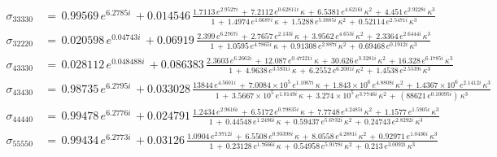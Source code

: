 \begin{align}
  \label{eq:ys33330}
  \sigma_{33330} \, &= \, 0.99569\,e^{6.2785i} \, + 0.014546 \, \frac{ 1.7113\,e^{2.9527i}  \, + \,  7.2112\,e^{0.62811i}\,\kappa \, + \, 6.5381\,e^{4.6216i}\,{\kappa}^{2} \, + \, 4.451\,e^{2.9228i}\,{\kappa}^{3} }{ 1 \, + \,   1.4974\,e^{1.6687i}\,\kappa \, + \, 1.5288\,e^{5.3885i}\,{\kappa}^{2} \, + \, 0.52114\,e^{2.5471i}\,{\kappa}^{3} }   \\
  \label{eq:ys32220}
  \sigma_{32220} \, &= \, 0.020598\,e^{0.04743i} \, + 0.06919 \, \frac{ 2.399\,e^{6.2767i}  \, + \,  2.7657\,e^{2.133i}\,\kappa \, + \, 3.9562\,e^{4.653i}\,{\kappa}^{2} \, + \, 2.3364\,e^{2.6444i}\,{\kappa}^{3} }{ 1 \, + \,   1.0595\,e^{4.7865i}\,\kappa \, + \, 0.91308\,e^{2.887i}\,{\kappa}^{2} \, + \, 0.69468\,e^{0.1912i}\,{\kappa}^{3} }   \\
  \label{eq:ys43330}
  \sigma_{43330} \, &= \, 0.028112\,e^{0.048488i} \, + 0.086383 \, \frac{  2.3603\,e^{6.2662i}  \, + \,  12.087\,e^{0.47221i}\,\kappa \, + \, 30.626\,e^{3.3281i}\,{\kappa}^{2} \, + \, 16.328\,e^{6.1785i}\,{\kappa}^{3} }{ 1 \, + \,   4.9638\,e^{3.5931i}\,\kappa \, + \, 6.2552\,e^{6.2001i}\,{\kappa}^{2} \, + \, 1.4538\,e^{2.5539i}\,{\kappa}^{3} }   \\
  \label{eq:ys43430}
  \sigma_{43430} \, &= \, 0.98735\,e^{6.2795i} \, + 0.033028 \, \frac{ 13844\,e^{4.5601i}  \, + \,  7.0084\times 10^5\,e^{1.1067i}\,\kappa \, + \, 1.843\times 10^6\,e^{4.8808i}\,{\kappa}^{2} \, + \, 1.4367\times 10^6\,e^{2.1412i}\,{\kappa}^{3} }{ 1 \, + \,   3.5667\times 10^5\,e^{1.0149i}\,\kappa \, + \, 3.274\times 10^5\,e^{3.7746i}\,{\kappa}^{2} \, + \, (88621\,e^{0.10095i})\,{\kappa}^{3} }   \\
  \label{eq:ys44440}
  \sigma_{44440} \, &= \, 0.99478\,e^{6.2776i} \, + 0.024791 \, \frac{ 1.2434\,e^{2.9616i}  \, + \,  6.5172\,e^{0.79835i}\,\kappa \, + \, 7.7748\,e^{4.2485i}\,{\kappa}^{2} \, + \, 1.1577\,e^{1.5905i}\,{\kappa}^{3} }{ 1 \, + \,   0.44548\,e^{1.2496i}\,\kappa \, + \, 0.59437\,e^{5.6732i}\,{\kappa}^{2} \, + \, 0.24743\,e^{2.8292i}\,{\kappa}^{3} }   \\
  \label{eq:ys55550}
  \sigma_{55550} \, &= \, 0.99434\,e^{6.2773i} \, + 0.03126 \, \frac{ 1.0904\,e^{2.9712i}  \, + \,  6.5508\,e^{0.93398i}\,\kappa \, + \, 8.0558\,e^{4.2881i}\,{\kappa}^{2} \, + \, 0.92971\,e^{1.0436i}\,{\kappa}^{3} }{ 1 \, + \,   0.23128\,e^{1.7666i}\,\kappa \, + \, 0.54958\,e^{5.9178i}\,{\kappa}^{2} \, + \, 0.213\,e^{3.0092i}\,{\kappa}^{3} }
\end{align}
